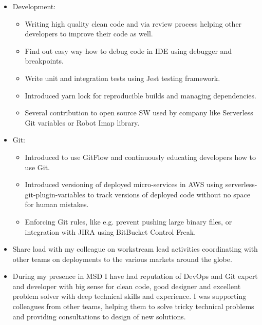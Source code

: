 \documentclass[11pt,a4paper,sans]{moderncv}
\begin{document}
{\begin{itemize}
\begin{itemize}
			\end{itemize}
			\item Development:
			\begin{itemize}
				\item Writing high quality clean code and via review process helping other developers to improve their code as well.
				\item Find out easy way how to debug code in IDE using debugger and breakpoints.
				\item Write unit and integration tests using Jest testing framework.
				\item Introduced yarn lock for reproducible builds and managing dependencies.
				\item Several contribution to open source SW used by company like Serverless Git variables or Robot Imap library.
			\end{itemize}
			\item Git:
			\begin{itemize}
				\item Introduced to use GitFlow and continuously educating developers how to use Git.
				\item Introduced versioning of deployed micro-services in AWS using serverless-git-plugin-variables to track versions of deployed code without no space for human mistakes.
				\item Enforcing Git rules, like e.g. prevent pushing large binary files, or integration with JIRA using BitBucket Control Freak.
			\end{itemize}
			\item Share load with my colleague on workstream lead activities coordinating with other teams on deployments to the various markets around the globe.
			\item During my presence in MSD I have had reputation of DevOps and Git expert and developer with big sense for clean code, good designer and excellent problem solver with deep technical skills and experience. I was supporting colleagues from other teams, helping them to solve tricky technical problems and providing consultations to design of new solutions.
		\end{itemize}
	}
\end{document}
